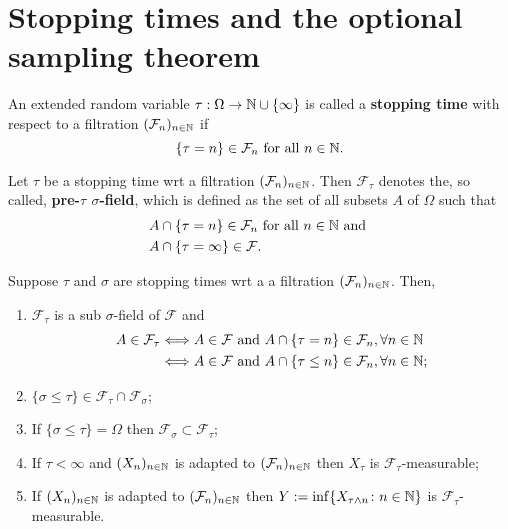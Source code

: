 \begin{example}
\end{example}

%
%
\section{Stopping times and the optional sampling theorem}

\begin{definition} An extended random variable $\tau:\Omega \rightarrow \Bbb N\cup\{\infty \}$ is called a {\bf stopping time} with respect to a filtration $(\mathcal F_n)_{n\in\Bbb N}$ if
\[
\{\tau = n \}\in \mathcal F_n\text{ for all $n\in\Bbb N$.}
\]
\end{definition}

\begin{definition}
Let $\tau$ be a stopping time wrt a filtration $(\mathcal F_n)_{n\in\Bbb N}$. Then $\mathcal F_\tau$ denotes the, so called, {\bf pre-$\tau$ $\sigma$-field}, which is defined as the set of all subsets $A$ of $\Omega$ such that
\begin{align*}
&A \cap\{\tau = n  \}\in \mathcal F_n \text{ for all $n\in \Bbb N$ and }\\
&A \cap\{\tau = \infty  \}\in \mathcal F.
\end{align*}
\end{definition}


\begin{theorem}
Suppose $\tau$ and $\sigma$ are stopping times wrt a a filtration $(\mathcal F_n)_{n\in\Bbb N}$. Then,
\begin{enumerate}
\item $\mathcal F_\tau$ is a sub $\sigma$-field of $\mathcal F$ and
\begin{align*}
A\in \mathcal F_\tau
&\Longleftrightarrow A\in \mathcal F \text{ and } A \cap\{\tau = n  \}\in \mathcal F_n,\forall n\in \Bbb N\\
&\Longleftrightarrow A\in \mathcal F \text{ and } A \cap\{\tau \leq n  \}\in \mathcal F_n,\forall n\in \Bbb N;
\end{align*}
\item $\{\sigma\leq \tau\}\in \mathcal F_\tau\cap \mathcal F_\sigma$;
\item If $\{\sigma\leq \tau\}=\Omega$ then $\mathcal F_\sigma \subset \mathcal F_\tau$;
\item If $\tau<\infty$ and $(X_n)_{n\in \Bbb N}$ is adapted to $(\mathcal F_n)_{n\in\Bbb N}$ then $X_\tau$ is $\mathcal F_\tau$-measurable;
\item If  $(X_n)_{n\in \Bbb N}$ is adapted to $(\mathcal F_n)_{n\in\Bbb N}$  then $Y:=\inf\{ X_{\tau\wedge n}\colon n\in \Bbb N\}$ is $\mathcal F_\tau$-measurable.
\end{enumerate}
\end{theorem}

